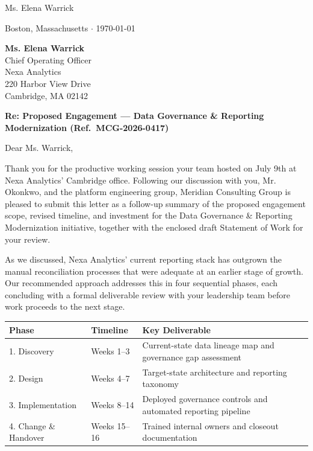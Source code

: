 \documentclass[a4paper,11pt]{scrletter}
\begin{document}

\begin{letter}{Ms. Elena Warrick}

\begin{flushright}
{\color{sidebarnavy}\sffamily Boston, Massachusetts \hspace{0.3em}$\cdot$\hspace{0.3em} \today}
\end{flushright}

\vspace{0.4cm}

\textbf{Ms. Elena Warrick}\\
Chief Operating Officer\\
Nexa Analytics\\
220 Harbor View Drive\\
Cambridge, MA 02142

\vspace{0.5cm}

{\color{sidebarnavy}\bfseries Re: Proposed Engagement --- Data Governance \& Reporting Modernization (Ref.\ MCG-2026-0417)}

\vspace{0.4cm}

\opening{Dear Ms. Warrick,}

Thank you for the productive working session your team hosted on July 9th at Nexa Analytics' Cambridge office. Following our discussion with you, Mr. Okonkwo, and the platform engineering group, Meridian Consulting Group is pleased to submit this letter as a follow-up summary of the proposed engagement scope, revised timeline, and investment for the Data Governance \& Reporting Modernization initiative, together with the enclosed draft Statement of Work for your review.

As we discussed, Nexa Analytics' current reporting stack has outgrown the manual reconciliation processes that were adequate at an earlier stage of growth. Our recommended approach addresses this in four sequential phases, each concluding with a formal deliverable review with your leadership team before work proceeds to the next stage.

\vspace{0.3cm}

\renewcommand{\arraystretch}{1.3}
\begin{tabular}{@{}p{2.9cm}p{2.5cm}p{5.3cm}@{}}
\toprule
\textbf{Phase} & \textbf{Timeline} & \textbf{Key Deliverable} \\
\midrule
1. Discovery & Weeks 1--3 & Current-state data lineage map and governance gap assessment \\
2. Design & Weeks 4--7 & Target-state architecture and reporting taxonomy \\
3. Implementation & Weeks 8--14 & Deployed governance controls and automated reporting pipeline \\
4. Change \& Handover & Weeks 15--16 & Trained internal owners and closeout documentation \\
\bottomrule
\end{tabular}


\end{letter}
\end{document}
